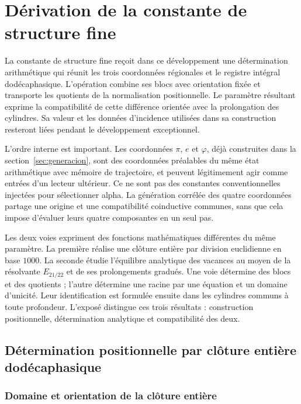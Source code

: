 \section{Dérivation de la constante de structure fine}
\label{sec:alpha}

La constante de structure fine reçoit dans ce développement une détermination arithmétique qui réunit les trois coordonnées régionales et le registre intégral dodécaphasique. L'opération combine ses blocs avec orientation fixée et transporte les quotients de la normalisation positionnelle. Le paramètre résultant exprime la compatibilité de cette différence orientée avec la prolongation des cylindres. Sa valeur et les données d'incidence utilisées dans sa construction resteront liées pendant le développement exceptionnel.

L’ordre interne est important. Les coordonnées \(\pi\),
\(e\) et \(\varphi\), déjà construites dans la section~\ref{sec:generacion}, sont des coordonnées
préalables du même état arithmétique avec mémoire de trajectoire, et peuvent légitimement agir comme
entrées d’un lecteur ultérieur. Ce ne sont pas des constantes conventionnelles
injectées pour sélectionner alpha. La génération corrélée des quatre coordonnées partage une origine et une
compatibilité coinductive communes, sans que cela impose d’évaluer leurs quatre
composantes en un seul pas.

Les deux voies expriment des fonctions mathématiques différentes du même paramètre.
La première réalise une clôture entière par division euclidienne en base
\(1000\). La seconde étudie l’équilibre analytique des vacances au moyen
de la résolvante \(E_{21/22}\) et de ses prolongements gradués. Une voie
détermine des blocs et des quotients ; l’autre détermine une racine par une
équation et un domaine d’unicité. Leur identification est formulée ensuite
dans les cylindres communs à toute profondeur. L’exposé distingue
ces trois résultats : construction positionnelle, détermination analytique
et compatibilité des deux.

\subsection{Détermination positionnelle par clôture entière dodécaphasique}
\subsubsection{Domaine et orientation de la clôture entière}
\label{subsec:alpha-dominio}

